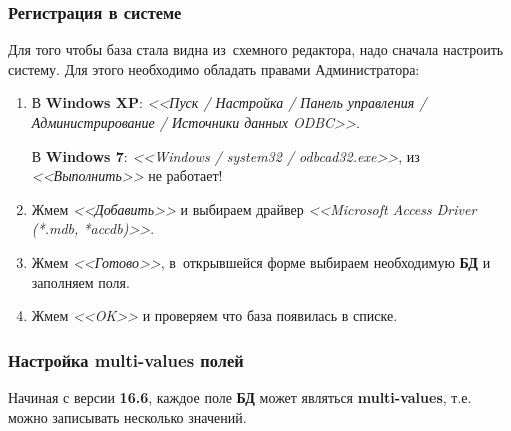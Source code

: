 \subsubsection{Регистрация в системе} \label{sssec:bd_install}
Для того чтобы база стала видна из~схемного редактора, надо сначала настроить систему. Для этого необходимо обладать правами Администратора:
\begin{enumerate}
	\item В \textbf{Windows XP}: \textit{<<Пуск / Настройка / Панель управления / Администрирование / Источники данных ODBC>>}.
	
	В \textbf{Windows 7}: \textit{<<Windows / system32 / odbcad32.exe>>}, из \textit{<<Выполнить>>} не работает! 
	
	\begin{figure}[H]
	\end{figure}
	
	\item Жмем \textit{<<Добавить>>} и выбираем драйвер \textit{<<Microsoft Access Driver (*.mdb, *accdb)>>}.
	
	\begin{figure}[H]
	\end{figure}
	
	
	\item Жмем \textit{<<Готово>>}, в~открывшейся форме выбираем необходимую \textbf{БД} и заполняем поля.
	
	\begin{figure}[H]
	\end{figure}
	
	\item Жмем \textit{<<OK>>} и проверяем что база появилась в списке.
\end{enumerate}



\subsubsection{Настройка multi-values полей} \label{sssec:bd_multi_value}

Начиная с версии \textbf{16.6}, каждое поле \textbf{БД} может являться \textbf{multi-values}, т.е. можно записывать несколько значений.

